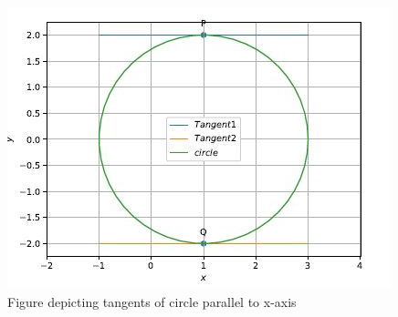  \begin{figure}[h!]
	\centering
	\includegraphics[width=\columnwidth]{./solutions/conics/1/6/fig1.JPG}
	\caption{Figure depicting tangents of circle parallel to x-axis}
	\label{eq:solutions/1/6/fig1}
\end{figure}
